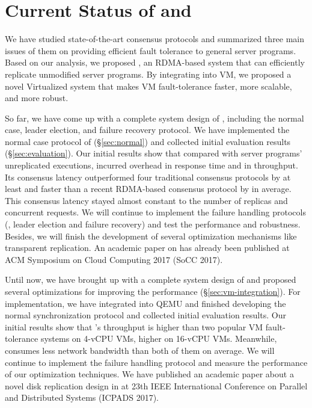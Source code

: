 \section{Current Status of \xxx and \yyy} \label{sec:status}
We have studied state-of-the-art consensus protocols and summarized 
three main issues of them on providing efficient fault tolerance to 
general server programs. Based on our analysis, we proposed \xxx, an RDMA-based 
\paxos system that can efficiently replicate unmodified server programs.
By integrating \xxx into VM, we proposed a novel Virtualized \smr 
system \yyy that makes VM fault-tolerance faster, more scalable, and 
more robust.

So far, we have come up with a complete system design of \xxx, including the 
normal case, leader election, and failure recovery protocol. We have 
implemented the normal case protocol of \xxx (\S\ref{sec:normal}) and collected 
initial evaluation results (\S\ref{sec:evaluation}). Our initial results show 
that compared with \nprog server programs' unreplicated executions, \xxx 
incurred \latencyoverhead overhead in response time and \tputoverhead in 
throughput. Its consensus latency outperformed four traditional consensus 
protocols by at least \comptradlow and faster than a recent RDMA-based 
consensus protocol \dare by \fasterDARE in average. This consensus latency 
stayed almost constant to the number of replicas and concurrent requests.
We will continue to implement the failure handling protocols (\ie, leader 
election and failure recovery) and test the performance and robustness. 
Besides, we will finish the development of several optimization mechanisms like 
transparent replication. An academic paper on \xxx has already been published 
at ACM Symposium on Cloud Computing 2017 (SoCC 2017).

Until now, we have brought up with a complete system design of \yyy and 
proposed several optimizations for improving the performance 
(\S\ref{sec:vm-integration}). For implementation, we have integrated 
\xxx into \kvm QEMU and finished developing the normal synchronization protocol 
and collected initial evaluation results. Our initial results show that \yyy's 
throughput is \avgtput higher than two popular VM fault-tolerance systems on 
4-vCPU VMs, \avgsixteen higher on 16-vCPU VMs. Meanwhile, \yyy consumes 
\avgbandwidth less network bandwidth than both of them on average.
We will continue to implement the failure handling protocol and measure the 
performance of our optimization techniques. We have published an academic paper 
about a novel disk replication design in \yyy at 23th IEEE International 
Conference on Parallel and Distributed Systems (ICPADS 2017).
